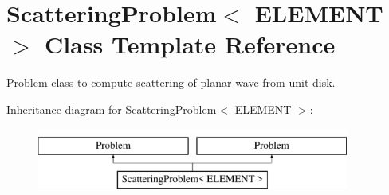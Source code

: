 \hypertarget{classScatteringProblem}{}\section{Scattering\+Problem$<$ E\+L\+E\+M\+E\+NT $>$ Class Template Reference}
\label{classScatteringProblem}


Problem class to compute scattering of planar wave from unit disk.  


Inheritance diagram for Scattering\+Problem$<$ E\+L\+E\+M\+E\+NT $>$\+:\begin{figure}[H]
\begin{center}
\leavevmode
\includegraphics[height=2.000000cm]{classScatteringProblem}
\end{center}
\end{figure}
